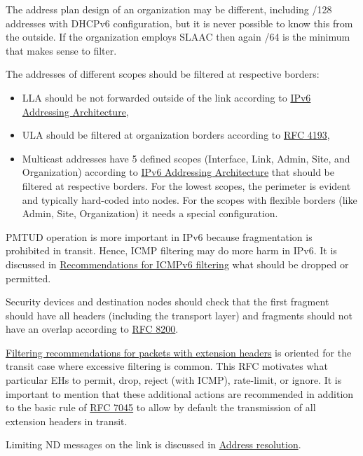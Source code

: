 \documentclass[
]{article}
\providecommand{\tightlist}{%
  \setlength{\itemsep}{0pt}\setlength{\parskip}{0pt}}
\begin{document}
The address plan design of an organization may be different, including
/128 addresses with DHCPv6 configuration, but it is never possible to
know this from the outside. If the organization employs SLAAC then again
/64 is the minimum that makes sense to filter.

The addresses of different scopes should be filtered at respective
borders:

\begin{itemize}
\tightlist
\item
  LLA should be not forwarded outside of the link according to
  \href{https://www.rfc-editor.org/info/rfc4291}{IPv6 Addressing
  Architecture},
\item
  ULA should be filtered at organization borders according to
  \href{https://www.rfc-editor.org/info/rfc4193}{RFC 4193},
\item
  Multicast addresses have 5 defined scopes (Interface, Link, Admin,
  Site, and Organization) according to
  \href{https://www.rfc-editor.org/info/rfc4291}{IPv6 Addressing
  Architecture} that should be filtered at respective borders. For the
  lowest scopes, the perimeter is evident and typically hard-coded into
  nodes. For the scopes with flexible borders (like Admin, Site,
  Organization) it needs a special configuration.
\end{itemize}

PMTUD operation is more important in IPv6 because fragmentation is
prohibited in transit. Hence, ICMP filtering may do more harm in IPv6.
It is discussed in
\href{https://www.rfc-editor.org/info/rfc4890}{Recommendations for
ICMPv6 filtering} what should be dropped or permitted.

Security devices and destination nodes should check that the first
fragment should have all headers (including the transport layer) and
fragments should not have an overlap according to
\href{https://www.rfc-editor.org/info/rfc8200}{RFC 8200}.

\href{https://www.rfc-editor.org/info/rfc9288}{Filtering recommendations
for packets with extension headers} is oriented for the transit case
where excessive filtering is common. This RFC motivates what particular
EHs to permit, drop, reject (with ICMP), rate-limit, or ignore. It is
important to mention that these additional actions are recommended in
addition to the basic rule of
\href{https://www.rfc-editor.org/info/rfc7045}{RFC 7045} to allow by
default the transmission of all extension headers in transit.

Limiting ND messages on the link is discussed in
\hyperref[address-resolution]{Address resolution}.
\end{document}

